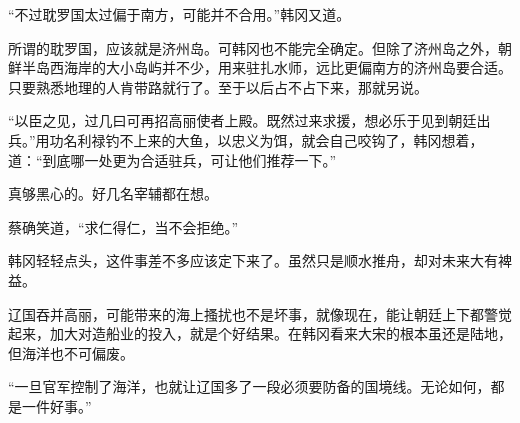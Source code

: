 “不过耽罗国太过偏于南方，可能并不合用。”韩冈又道。

所谓的耽罗国，应该就是济州岛。可韩冈也不能完全确定。但除了济州岛之外，朝鲜半岛西海岸的大小岛屿并不少，用来驻扎水师，远比更偏南方的济州岛要合适。只要熟悉地理的人肯带路就行了。至于以后占不占下来，那就另说。

“以臣之见，过几曰可再招高丽使者上殿。既然过来求援，想必乐于见到朝廷出兵。”用功名利禄钓不上来的大鱼，以忠义为饵，就会自己咬钩了，韩冈想着，道：“到底哪一处更为合适驻兵，可让他们推荐一下。”

真够黑心的。好几名宰辅都在想。

蔡确笑道，“求仁得仁，当不会拒绝。”

韩冈轻轻点头，这件事差不多应该定下来了。虽然只是顺水推舟，却对未来大有裨益。

辽国吞并高丽，可能带来的海上搔扰也不是坏事，就像现在，能让朝廷上下都警觉起来，加大对造船业的投入，就是个好结果。在韩冈看来大宋的根本虽还是陆地，但海洋也不可偏废。

“一旦官军控制了海洋，也就让辽国多了一段必须要防备的国境线。无论如何，都是一件好事。”

